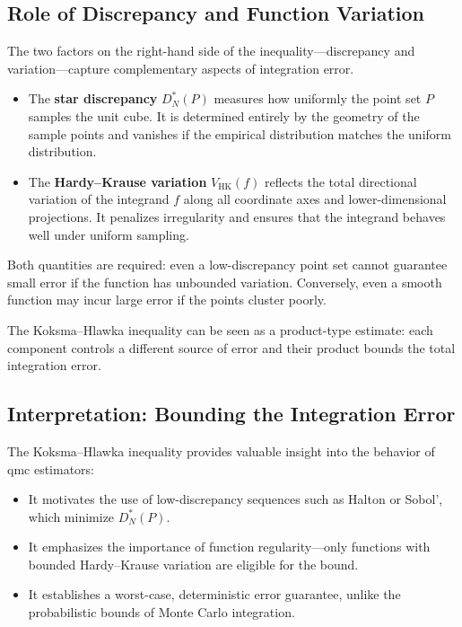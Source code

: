 \subsection{Role of Discrepancy and Function Variation}

The two factors on the right-hand side of the inequality—discrepancy and variation—capture complementary aspects of integration error.

\begin{itemize}
    \item The \textbf{star discrepancy} $D_N^*(P)$ measures how uniformly the point set $P$ samples the unit cube. It is determined entirely by the geometry of the sample points and vanishes if the empirical distribution matches the uniform distribution.
    \item The \textbf{Hardy--Krause variation} $V_{\mathrm{HK}}(f)$ reflects the total directional variation of the integrand $f$ along all coordinate axes and lower-dimensional projections. It penalizes irregularity and ensures that the integrand behaves well under uniform sampling.
\end{itemize}

Both quantities are required: even a low-discrepancy point set cannot guarantee small error if the function has unbounded variation. Conversely, even a smooth function may incur large error if the points cluster poorly.

\begin{remark}
The Koksma--Hlawka inequality can be seen as a product-type estimate: each component controls a different source of error and their product bounds the total integration error.
\end{remark}


\subsection{Interpretation: Bounding the Integration Error}

The Koksma--Hlawka inequality provides valuable insight into the behavior of \acl{qmc} estimators:

\begin{itemize}
    \item It motivates the use of low-discrepancy sequences such as Halton or Sobol', which minimize $D_N^*(P)$.
    \item It emphasizes the importance of function regularity—only functions with bounded Hardy--Krause variation are eligible for the bound.
    \item It establishes a worst-case, deterministic error guarantee, unlike the probabilistic bounds of Monte Carlo integration.
\end{itemize}

